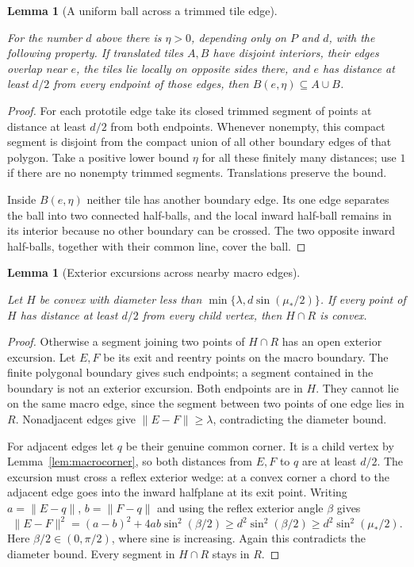 \documentclass[11pt,a4paper]{article}
\newtheorem{lemma}[definition]{Lemma}
\theoremstyle{remark}
\newcommand{\lean}[1]{}
\newcommand{\uses}[1]{}
\begin{document}
\begin{lemma}[A uniform ball across a trimmed tile edge]
\label{lem:trimmed-edge-ball}
\lean{Tilings.Crowns.trimmedEdgeTwoTileBall}
\uses{def:polygon,def:protoset,def:tiling,lem:polygon-local-cone,lem:relative-crown-ball}
For the number $d$ above there is $\eta>0$, depending only on $P$ and
$d$, with the following property.  If translated tiles $A,B$ have
disjoint interiors, their edges overlap near $e$, the tiles lie locally
on opposite sides there, and $e$ has distance at least $d/2$ from every
endpoint of those edges, then $B(e,\eta)\subseteq A\cup B$.
\end{lemma}
\begin{proof}
For each prototile edge take its closed trimmed segment of points at
distance at least $d/2$ from both endpoints.  Whenever nonempty, this
compact segment is disjoint from the compact union of all other boundary
edges of that polygon.  Take a positive lower bound $\eta$ for all these
finitely many distances; use $1$ if there are no nonempty trimmed
segments.  Translations preserve the bound.

Inside $B(e,\eta)$ neither tile has another boundary edge.  Its one edge
separates the ball into two connected half-balls, and the local inward
half-ball remains in its interior because no other boundary can be
crossed.  The two opposite inward half-balls, together with their common
line, cover the ball.
\end{proof}

\begin{lemma}[Exterior excursions across nearby macro edges]
\label{lem:exterior-excursion}
\lean{Tilings.Crowns.noShortExteriorExcursion}
\uses{def:macro-boundary,def:crown-separation,lem:macrocorner,lem:relative-crown-ball}
Let $H$ be convex with diameter less than
$\min\{\lambda,d\sin(\mu_*/2)\}$.  If every point of $H$ has distance
at least $d/2$ from every child vertex, then $H\cap R$ is convex.
\end{lemma}
\begin{proof}
Otherwise a segment joining two points of $H\cap R$ has an open exterior
excursion.  Let $E,F$ be its exit and reentry points on the macro boundary.
The finite polygonal boundary gives such endpoints; a segment contained
in the boundary is not an exterior excursion.  Both endpoints are in $H$.
They cannot lie on the same macro edge, since the segment between two
points of one edge lies in $R$.  Nonadjacent edges give
$\lVert E-F\rVert\ge\lambda$, contradicting the diameter bound.

For adjacent edges let $q$ be their genuine common corner.  It is a child
vertex by Lemma~\ref{lem:macrocorner}, so both distances from $E,F$ to
$q$ are at least $d/2$.  The excursion must cross a reflex exterior
wedge: at a convex corner a chord to the adjacent edge goes into the
inward halfplane at its exit point.  Writing $a=\lVert E-q\rVert$,
$b=\lVert F-q\rVert$ and using the reflex exterior angle $\beta$ gives
\[
 \lVert E-F\rVert^2=(a-b)^2+4ab\sin^2(\beta/2)
       \ge d^2\sin^2(\beta/2)
       \ge d^2\sin^2(\mu_*/2).
\]
Here $\beta/2\in(0,\pi/2)$, where sine is increasing.  Again this
contradicts the diameter bound.  Every segment in $H\cap R$ stays in $R$.
\end{proof}
\end{document}
